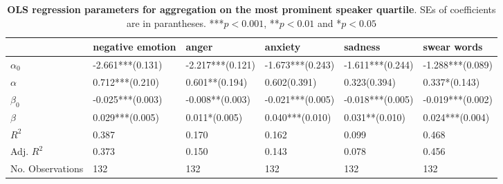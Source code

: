 \begin{table}[h]\centering
\caption{\textbf{OLS regression parameters for aggregation on the most prominent speaker quartile}. SEs of coefficients are in parantheses. ***$p < 0.001$, **$p < 0.01$ and *$p < 0.05$}
	\label{fig: Verbosity_1}
\begin{adjustbox}{width=\linewidth, center}
	\begin{tabular}{llllll}
	\toprule
	{} &            negative emotion &                                           anger &                                                   anxiety &                                                   sadness &                                     swear words \\
	\midrule
	$\alpha_0$       &            -2.661***(0.131) &                                -2.217***(0.121) &                                          -1.673***(0.243) &                                          -1.611***(0.244) &                                -1.288***(0.089) \\
	$\alpha$         &  \phantom{-}0.712***(0.210) &            \phantom{-}0.601**\phantom{*}(0.194) &  \phantom{-}0.602\phantom{*}\phantom{*}\phantom{*}(0.391) &  \phantom{-}0.323\phantom{*}\phantom{*}\phantom{*}(0.394) &  \phantom{-}0.337*\phantom{*}\phantom{*}(0.143) \\
	$\beta_0$        &            -0.025***(0.003) &                      -0.008**\phantom{*}(0.003) &                                          -0.021***(0.005) &                                          -0.018***(0.005) &                                -0.019***(0.002) \\
	$\beta$          &  \phantom{-}0.029***(0.005) &  \phantom{-}0.011*\phantom{*}\phantom{*}(0.005) &                                \phantom{-}0.040***(0.010) &                      \phantom{-}0.031**\phantom{*}(0.010) &                      \phantom{-}0.024***(0.004) \\
	$R^2$            &                       0.387 &                                           0.170 &                                                     0.162 &                                                     0.099 &                                           0.468 \\
	Adj. $R^2$       &                       0.373 &                                           0.150 &                                                     0.143 &                                                     0.078 &                                           0.456 \\
	No. Observations &                         132 &                                             132 &                                                       132 &                                                       132 &                                             132 \\
	\bottomrule
	\end{tabular}
	
\end{adjustbox}
	\end{table}

